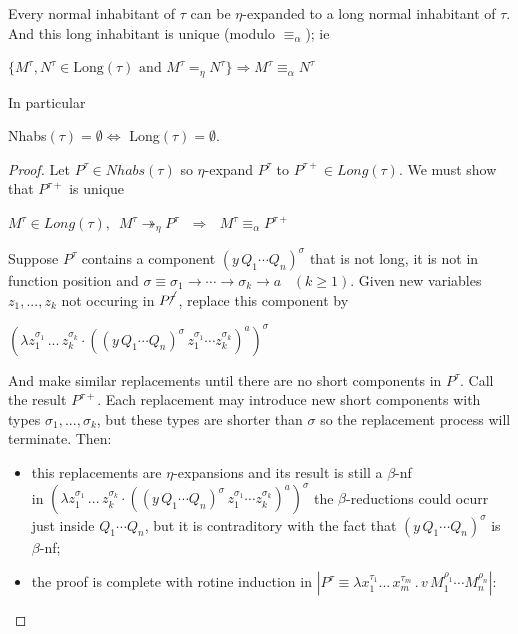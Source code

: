 \documentclass[a4paper,10pt]{article}
\begin{document}
\begin{lem} \label{8A8} Every normal inhabitant of $\tau$ can be $\eta$-expanded to a long normal inhabitant of $\tau$.
And this long inhabitant is unique (modulo $\equiv_{\alpha}$); ie
\begin{center}
$\{M^{\tau}, N^{\tau} \in \mbox{Long}(\tau) \mbox{ and } M^{\tau} =_{\eta} N^{\tau}\} \Longrightarrow  M^{\tau} \equiv_{\alpha} N^{\tau}$ 
\end{center}
In particular
\begin{center}
 Nhabs$(\tau) = \emptyset \Longleftrightarrow$ Long$(\tau) = \emptyset$. 
\end{center}
\begin{proof}
  Let $P^{\tau} \in Nhabs(\tau)$ so $\eta$-expand $P^{\tau}$ to $P^{\tau +} \in Long(\tau)$. We must show that $P^{\tau +}$ is unique
  \begin{center}
   $M^{\tau} \in Long(\tau), \,\,\, M^{\tau}\twoheadrightarrow_{\eta} P^{\tau} \,\,\,\,\Longrightarrow \,\,\,\,M^{\tau} \equiv_{\alpha} P^{\tau +}$
  \end{center}
  Suppose $P^{\tau}$ contains a component $(y\,Q_1\cdots Q_n)^{\sigma}$ that is not long, it is not in function position and 
  $\sigma \equiv \sigma_1 \to \cdots \to \sigma_k \to a\,\,\,\,\, (k \geq 1)$.
  Given new variables $z_1, ..., z_k$ not occuring in $P^{\cancel{\tau}}$, replace this component by
  \begin{center}
   $(\lambda z_1^{\sigma_1}\,...\, z_k^{\sigma_k} \cdot ((y\,Q_1\cdots Q_n)^{\sigma}\, z_1^{\sigma_1}\cdots z_k^{\sigma_k})^a)^{\sigma}$
  \end{center}
  And make similar replacements until there are no short components in $P^{\tau}$. Call the result $P^{\tau +}$.  
  Each replacement may introduce new short components with types $\sigma_1, ..., \sigma_k$, but these types are shorter than $\sigma$ so
  the replacement process will terminate. Then:
 \begin{itemize}
  \item this replacements are $\eta$-expansions and its result is still a $\beta$-nf\\
  in $(\lambda z_1^{\sigma_1}\,...\, z_k^{\sigma_k} \cdot ((y\,Q_1\cdots Q_n)^{\sigma}\, z_1^{\sigma_1}\cdots z_k^{\sigma_k})^a)^{\sigma}$ the 
  $\beta$-reductions could ocurr just inside $Q_1\cdots Q_n$, but it is contraditory with the fact that $(y\,Q_1\cdots Q_n)^{\sigma}$ is $\beta$-nf;
  \item the proof is complete with rotine induction in $|P^{\tau} \equiv \lambda x_1^{\tau_1} ... \,x_m^{\tau_m} \, . \, v\, M^{\rho_1}_1 \cdots M^{\rho_n}_n|$:\\

\end{itemize}
\end{proof}
\end{lem}
\end{document}
